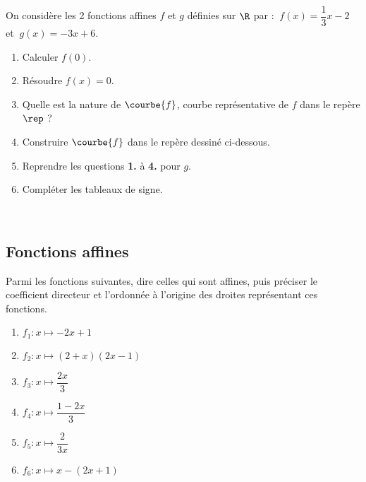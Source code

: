 \documentclass[a4paper,11pt,exos]{nsi} %
\begin{document}
	On considère les 2 fonctions affines $f$ et $g$ définies sur $\R$ par : $\ f(x)=\dfrac{1}{3}x-2\ $ et $\ g(x)=-3x+6$.
	\begin{enumerate}
		\item 	Calculer $f(0)$.
		\item 	Résoudre $f(x)=0$.
		\item 	Quelle est la nature de $\courbe{f}$, courbe représentative de $f$ dans le repère $\rep$ ?
		\item 	Construire $\courbe{f}$ dans le repère dessiné ci-dessous.
		\item	Reprendre les questions \textbf{1.} à \textbf{4.} pour $g$.
		\item 	Compléter les tableaux de signe.
	\end{enumerate}

\begin{multicols}{2}
    \\
\vspace{0.5cm}
\end{multicols}
	
	
	


\subsection*{Fonctions affines}

\exo{}
Parmi les fonctions suivantes, dire celles qui sont affines, puis préciser le coefficient directeur et l’ordonnée à l’origine des droites représentant ces fonctions.
\begin{multicols}{3}
	\begin{enumerate}
		\item 	$f_1:x\mapsto-2x+1$
		\item 	$f_2:x\mapsto(2+x)(2x-1)$
		\item	$f_3:x\mapsto\dfrac{2x}{3}$
		\item	$f_4:x\mapsto\dfrac{1-2x}{3}$
		\item	$f_5:x\mapsto\dfrac{2}{3x}$
		\item	$f_6:x\mapsto x-(2x+1)$
	\end{enumerate}
\end{multicols}
\end{document}
